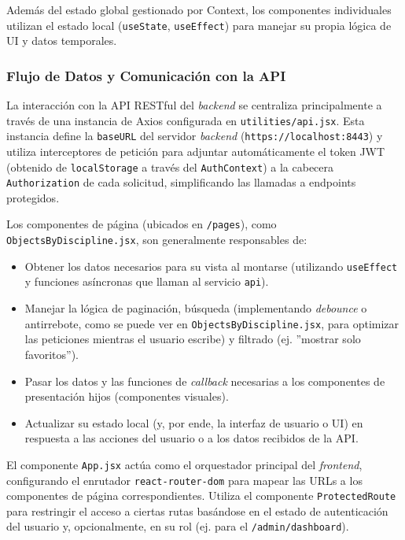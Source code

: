 Además del estado global gestionado por Context, los componentes individuales utilizan el estado local (\texttt{useState}, \texttt{useEffect}) para manejar su propia lógica de UI y datos temporales.

\subsubsection{Flujo de Datos y Comunicación con la API}
\label{sssec:frontendFlujoDatosApi}

La interacción con la API RESTful del \textit{backend} se centraliza principalmente a través de una instancia de Axios configurada en \texttt{utilities/api.jsx}. Esta instancia define la \texttt{baseURL} del servidor \textit{backend} (\texttt{https://localhost:8443}) y utiliza interceptores de petición para adjuntar automáticamente el token JWT (obtenido de \texttt{localStorage} a través del \texttt{AuthContext}) a la cabecera \texttt{Authorization} de cada solicitud, simplificando las llamadas a endpoints protegidos.

Los componentes de página (ubicados en \texttt{/pages}), como \texttt{ObjectsByDiscipline.jsx}, son generalmente responsables de:
\begin{itemize}
    \item Obtener los datos necesarios para su vista al montarse (utilizando \texttt{useEffect} y funciones asíncronas que llaman al servicio \texttt{api}).
    \item Manejar la lógica de paginación, búsqueda (implementando \textit{debounce} o antirrebote, como se puede ver en \texttt{ObjectsByDiscipline.jsx}, para optimizar las peticiones mientras el usuario escribe) y filtrado (ej. ''mostrar solo favoritos'').
    \item Pasar los datos y las funciones de \textit{callback} necesarias a los componentes de presentación hijos (componentes visuales). 
    \item Actualizar su estado local (y, por ende, la interfaz de usuario o UI) en respuesta a las acciones del usuario o a los datos recibidos de la API.
\end{itemize}
El componente \texttt{App.jsx} actúa como el orquestador principal del \textit{frontend}, configurando el enrutador \texttt{react-router-dom} para mapear las URLs a los componentes de página correspondientes. Utiliza el componente \texttt{ProtectedRoute} para restringir el acceso a ciertas rutas basándose en el estado de autenticación del usuario y, opcionalmente, en su rol (ej. para el \texttt{/admin/dashboard}).

